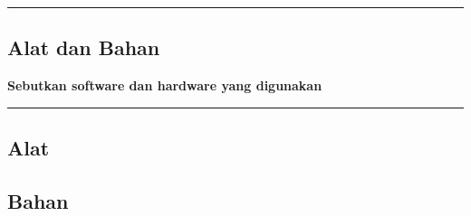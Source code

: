 {\color{gray}\hrule}
\begin{center}
\section{Alat dan Bahan}
\textbf{Sebutkan software dan hardware yang digunakan}
\end{center}
{\color{gray}\hrule}
\begin{multicols}{2}
\subsection{Alat}
\lipsum[1]
\subsection{Bahan}
\lipsum[1]
\end{multicols}